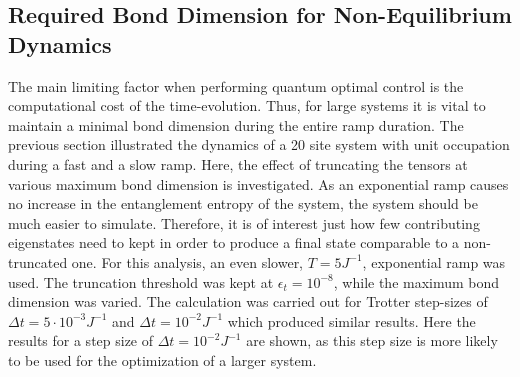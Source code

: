 \subsection{Required Bond Dimension for Non-Equilibrium Dynamics}
The main limiting factor when performing quantum optimal control is the computational cost of the time-evolution. Thus, for large systems it is vital to maintain a minimal bond dimension during the entire ramp duration. The previous section illustrated the dynamics of a 20 site system with unit occupation during a fast and a slow ramp. Here, the effect of truncating the tensors at various maximum bond dimension is investigated. As an exponential ramp causes no increase in the entanglement entropy of the system, the system should be much easier to simulate. Therefore, it is of interest just how few contributing eigenstates need to kept in order to produce a final state comparable to a non-truncated one.
For this analysis, an even slower, $T = 5 J^{-1}$, exponential ramp was used. The truncation threshold was kept at $\epsilon_t = 10^{-8}$, while the maximum bond dimension was varied. The calculation was carried out for Trotter step-sizes of $\Delta t = 5 \cdot 10^{-3} J^{-1}$ and $\Delta t = 10^{-2} J^{-1}$ which produced similar results. Here the results for a step size of $\Delta t = 10^{-2} J^{-1}$ are shown, as this step size is more likely to be used for the optimization of a larger system.\\ 

